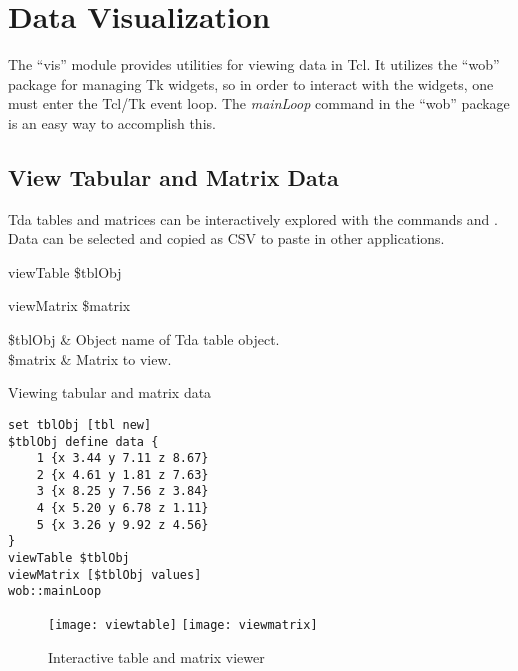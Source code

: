 \cleartooddpage[\thispagestyle{empty}]
\chapter{Data Visualization}\label{vis}
The ``vis'' module provides utilities for viewing data in Tcl. 
It utilizes the ``wob'' package for managing Tk widgets, so in order to interact with the widgets, one must enter the Tcl/Tk event loop. 
The \textit{mainLoop} command in the ``wob'' package is an easy way to accomplish this.

\clearpage
\section{View Tabular and Matrix Data}
Tda tables and matrices can be interactively explored with the commands  and . 
Data can be selected and copied as CSV to paste in other applications.

\begin{syntax}
viewTable \$tblObj
\end{syntax}
\begin{syntax}
viewMatrix \$matrix
\end{syntax}
\begin{args}
\$tblObj & Object name of Tda table object. \\
\$matrix  & Matrix to view. 
\end{args}
\begin{example}{Viewing tabular and matrix data}
\begin{lstlisting}
set tblObj [tbl new]
$tblObj define data {
    1 {x 3.44 y 7.11 z 8.67}
    2 {x 4.61 y 1.81 z 7.63}
    3 {x 8.25 y 7.56 z 3.84}
    4 {x 5.20 y 6.78 z 1.11}
    5 {x 3.26 y 9.92 z 4.56}
}
viewTable $tblObj
viewMatrix [$tblObj values]
wob::mainLoop
\end{lstlisting}
\end{example}
\begin{figure}[!htb]
\centering
\texttt{[image: viewtable]}
\texttt{[image: viewmatrix]}
\caption{Interactive table and matrix viewer}
\label{fig:viewdata}
\end{figure}

\clearpage
